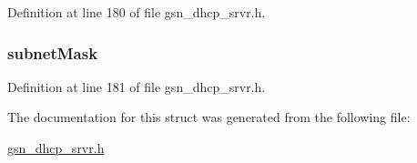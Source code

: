 Definition at line 180 of file gsn\_\-dhcp\_\-srvr.h.

\hypertarget{a00044_a57e84f1cb54cb270925550e459768abe}{
\subsubsection[{subnetMask}]{ {\bf subnetMask}}}
\label{a00044_a57e84f1cb54cb270925550e459768abe}


Definition at line 181 of file gsn\_\-dhcp\_\-srvr.h.



The documentation for this struct was generated from the following file:\begin{DoxyCompactItemize}
\item 
\hyperlink{a00482}{gsn\_\-dhcp\_\-srvr.h}\end{DoxyCompactItemize}
